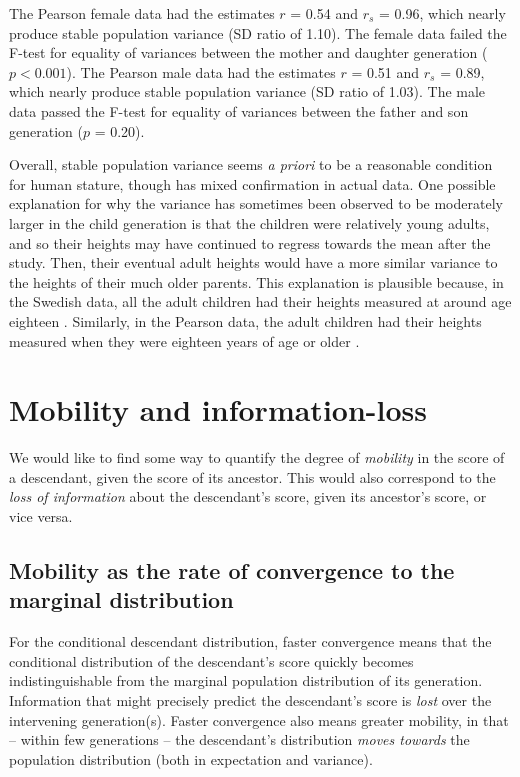 \documentclass[a4paper,11pt]{article} %
\begin{document}
The Pearson female data had the estimates $r$ = 0.54 and $r_s$ = 0.96, which nearly produce stable population variance (SD ratio of 1.10). The female data failed the F-test for equality of variances between the mother and daughter generation ($p < 0.001$). The Pearson male data had the estimates $r$ = 0.51 and $r_s$ = 0.89, which nearly produce stable population variance (SD ratio of 1.03). The male data passed the F-test for equality of variances between the father and son generation ($p$ = 0.20). 


Overall, stable population variance seems \emph{a priori} to be a reasonable condition for human stature, though has mixed confirmation in actual data. One possible explanation for why the variance has sometimes been observed to be moderately larger in the child generation is that the children were relatively young adults, and so their heights may have continued to regress towards the mean after the study. Then, their eventual adult heights would have a more similar variance to the heights of their much older parents. This explanation is plausible because, in the Swedish data, all the adult children had their heights measured at around age eighteen \cite{karlberg}. Similarly, in the Pearson data, the adult children had their heights measured when they were eighteen years of age or older \cite{pearson}. 



\section{Mobility and information-loss}

We would like to find some way to quantify the degree of \emph{mobility} in the score of a descendant, given the score of its ancestor. This would also correspond to the \emph{loss of information} about the descendant's score, given its ancestor's score, or vice versa.

\subsection{Mobility as the rate of convergence to the marginal distribution}
For the conditional descendant distribution, faster convergence means that the conditional distribution of the descendant's score quickly becomes indistinguishable from the marginal population distribution of its generation. Information that might precisely predict the descendant's score is \emph{lost} over the intervening generation(s). Faster convergence also means greater mobility, in that -- within few generations -- the descendant's distribution \emph{moves towards} the population distribution (both in expectation and variance). 
\end{document}
